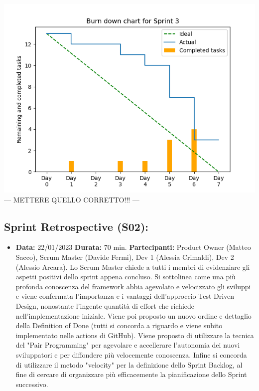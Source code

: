 \documentclass[a4paper, oneside]{article}
\newcommand\due{Scrum Master (Davide Fermi), Dev 1 (Alessia Crimaldi), Dev 2 (Alessio Arcara).}
\newcommand\dueP{Product Owner (Matteo Sacco), }
\begin{document}
\begin{landscape}
\begin{itemize}
            \includegraphics[scale=0.8]{Sprint03_BurnDownChart}
            --- METTERE QUELLO CORRETTO!!! ---
        \end{itemize}

        \newpage
        \subsection{Sprint Retrospective (S02):}
        \begin{itemize}
            \item \textbf{Data:} 22/01/2023
            \newline \textbf{Durata:} 70 min.
            \newline \textbf{Partecipanti:}  \dueP \due
            \newline
            \newline Lo Scrum Master chiede a tutti i membri di evidenziare gli aspetti positivi dello sprint appena concluso. Si sottolinea come una più profonda conoscenza del framework abbia agevolato e velocizzato gli sviluppi e viene confermata l'importanza e i vantaggi dell'approccio Test Driven Design, nonostante l'ingente quantità di effort che richiede nell'implementazione iniziale. Viene poi proposto un nuovo ordine e dettaglio della Definition of Done (tutti si concorda a riguardo e viene subito implementato nelle actions di GitHub). Viene proposto di utilizzare la tecnica del "Pair Programming" per agevolare e accellerare l'autonomia dei nuovi sviluppatori e per diffondere più velocemente conoscenza. Infine si concorda di utilizzare il metodo "velocity" per la definizione dello Sprint Backlog, al fine di cercare di organizzare più efficacemente la pianificazione dello Sprint successivo.
        \end{itemize}


\end{landscape}
\end{document}
